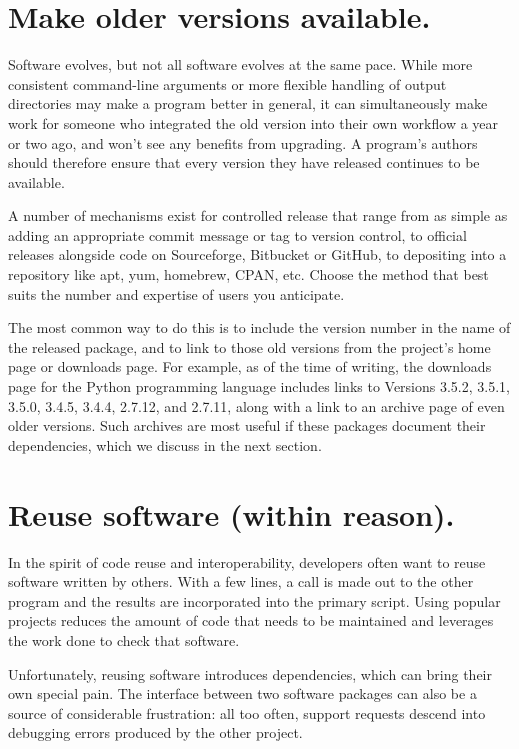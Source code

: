 \documentclass[10pt,letterpaper]{article}
\begin{document}
\section{Make older versions available.}

Software evolves, but not all software evolves at the same pace.
While more consistent command-line arguments
or more flexible handling of output directories
may make a program better in general,
it can simultaneously make work for someone
who integrated the old version into their own workflow a year or two ago,
and won't see any benefits from upgrading.
A program's authors should therefore ensure that every version they have released
continues to be available.

A number of mechanisms exist for
controlled release that range from as simple as adding an appropriate
commit message or tag to version control, to official releases alongside
code on Sourceforge, Bitbucket or GitHub, to depositing into a
repository like apt, yum, homebrew, CPAN, etc. Choose the method that
best suits the number and expertise of users you anticipate.

The most common way to do this is to include the version number in the
name of the released package, and to link to those old versions from
the project's home page or downloads page.
For example,
as of the time of writing,
the downloads page for the Python programming language includes links to
Versions 3.5.2, 3.5.1, 3.5.0, 3.4.5, 3.4.4, 2.7.12, and 2.7.11,
along with a link to an archive page of even older versions.
Such archives are most useful if these packages document their dependencies,
which we discuss in the next section.

\section{Reuse software (within reason).}

In the spirit of code reuse and interoperability, developers often want
to reuse software written by others. 
With a few lines, a call
is made out to the other program and the results are incorporated into the
primary script. Using popular projects reduces the amount of code that
needs to be maintained and leverages the work done to check that software.

Unfortunately, reusing software introduces dependencies, which can
bring their own special pain.  The interface between two software
packages can also be a source of considerable frustration: all too
often, support requests descend into debugging errors produced by the
other project.
\end{document}
